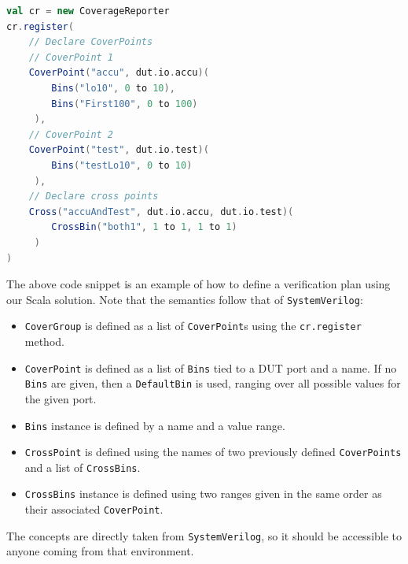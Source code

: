 \documentclass[conference]{IEEEtran}
\begin{document}
\begin{lstlisting}[language=scala]
val cr = new CoverageReporter
cr.register(
    // Declare CoverPoints
    // CoverPoint 1
    CoverPoint("accu", dut.io.accu)(
        Bins("lo10", 0 to 10),
        Bins("First100", 0 to 100)
     ),
    // CoverPoint 2
    CoverPoint("test", dut.io.test)(
        Bins("testLo10", 0 to 10)
     ),
    // Declare cross points
    Cross("accuAndTest", dut.io.accu, dut.io.test)(
        CrossBin("both1", 1 to 1, 1 to 1)
     )
)
\end{lstlisting}
The above code snippet is an example of how to define a verification plan using our Scala solution. Note that the semantics follow that of \texttt{SystemVerilog}:
\begin{itemize}
    \item \texttt{CoverGroup} is defined as a list of \texttt{CoverPoint}s using the \texttt{cr.register} method.
    \item \texttt{CoverPoint} is defined as a list of \texttt{Bins} tied to a DUT port and a name. If no \texttt{Bins} are given, then a \texttt{DefaultBin} is used, ranging over all possible values for the given port.
    \item \texttt{Bins} instance is defined by a name and a value range.
    \item \texttt{CrossPoint} is defined using the names of two previously defined \texttt{CoverPoints} and a list of \texttt{CrossBins}.
    \item \texttt{CrossBins} instance is defined using two ranges given in the same order as their associated \texttt{CoverPoint}.
\end{itemize}
The concepts are directly taken from \texttt{SystemVerilog}, so it should be accessible to anyone coming from that environment. 
\end{document}
